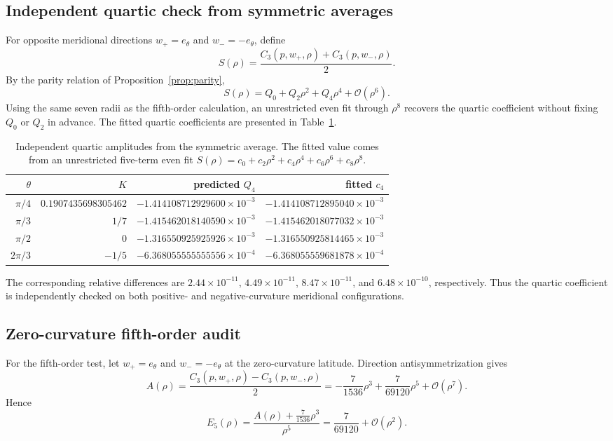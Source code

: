 \documentclass[11pt]{amsart}
\numberwithin{equation}{section}
\theoremstyle{remark}
\newcommand{\bigO}{\mathcal{O}}
\begin{document}
\subsection{Independent quartic check from symmetric averages}
For opposite meridional directions $w_+=e_\theta$ and $w_-=-e_\theta$, define
\[
 S(\rho)=\frac{C_3(p,w_+,\rho)+C_3(p,w_-,\rho)}{2}.
\]
By the parity relation of Proposition~\ref{prop:parity},
\[
 S(\rho)=Q_0+Q_2\rho^2+Q_4\rho^4+\bigO(\rho^6).
\]
Using the same seven radii as the fifth-order calculation, an unrestricted even fit through $\rho^8$ recovers the quartic coefficient without fixing $Q_0$ or $Q_2$ in advance.  The fitted quartic coefficients are presented in Table~\ref{tab:quartic-numerical}.
\begin{table}[htbp]
\centering
\caption{Independent quartic amplitudes from the symmetric average.  The fitted value comes from an unrestricted five-term even fit $S(\rho)=c_0+c_2\rho^2+c_4\rho^4+c_6\rho^6+c_8\rho^8$.}
\label{tab:quartic-numerical}
\begin{tabular}{rrrr}
\toprule
$\theta$ & $K$ & predicted $Q_4$ & fitted $c_4$\\
\midrule
$\pi/4$ & $0.1907435698305462$ & $-1.414108712929600\times10^{-3}$ & $-1.414108712895040\times10^{-3}$\\
$\pi/3$ & $1/7$ & $-1.415462018140590\times10^{-3}$ & $-1.415462018077032\times10^{-3}$\\
$\pi/2$ & $0$ & $-1.316550925925926\times10^{-3}$ & $-1.316550925814465\times10^{-3}$\\
$2\pi/3$ & $-1/5$ & $-6.368055555555556\times10^{-4}$ & $-6.368055559681878\times10^{-4}$\\
\bottomrule
\end{tabular}
\end{table}
The corresponding relative differences are $2.44\times10^{-11}$, $4.49\times10^{-11}$, $8.47\times10^{-11}$, and $6.48\times10^{-10}$, respectively.  Thus the quartic coefficient is independently checked on both positive- and negative-curvature meridional configurations.

\subsection{Zero-curvature fifth-order audit}
For the fifth-order test, let $w_+=e_\theta$ and $w_-=-e_\theta$ at the zero-curvature latitude.  Direction antisymmetrization gives
\[
 A(\rho)=\frac{C_3(p,w_+,\rho)-C_3(p,w_-,\rho)}{2}
 =-\frac7{1536}\rho^3+\frac7{69120}\rho^5+\bigO(\rho^7).
\]
Hence
\begin{equation}\label{eq:E5}
 E_5(\rho)=\frac{A(\rho)+\frac7{1536}\rho^3}{\rho^5}
 =\frac7{69120}+\bigO(\rho^2).
\end{equation}
\end{document}

